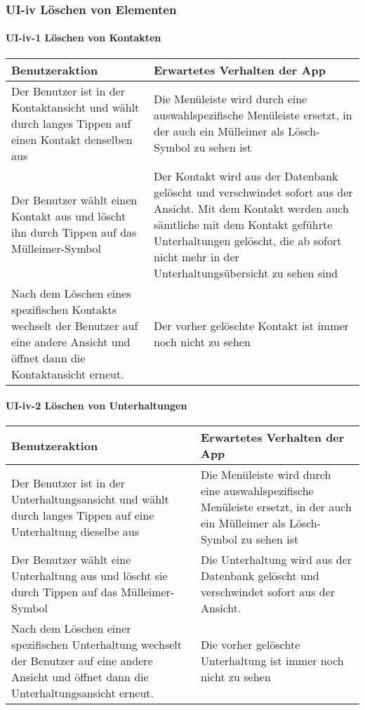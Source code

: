 
\clearpage
\subsubsection{UI-iv Löschen von Elementen}

\paragraph{UI-iv-1 Löschen von Kontakten}

\begin{longtable}{|p{8cm}|p{8.5cm}|}
\hline
Benutzeraktion & Erwartetes Verhalten der App\tabularnewline
\hline

Der Benutzer ist in der Kontaktansicht und wählt durch langes Tippen auf
einen Kontakt denselben aus & Die Menüleiste wird durch eine
auswahlspezifische Menüleiste ersetzt, in der auch ein Mülleimer als
Lösch-Symbol zu sehen ist\tabularnewline
Der Benutzer wählt einen Kontakt aus und löscht ihn durch Tippen auf das
Mülleimer-Symbol & Der Kontakt wird aus der Datenbank gelöscht und
verschwindet sofort aus der Ansicht. Mit dem Kontakt werden auch
sämtliche mit dem Kontakt geführte Unterhaltungen gelöscht, die ab
sofort nicht mehr in der Unterhaltungsübersicht zu sehen
sind\tabularnewline
Nach dem Löschen eines spezifischen Kontakts wechselt der Benutzer auf
eine andere Ansicht und öffnet dann die Kontaktansicht erneut. & Der
vorher gelöschte Kontakt ist immer noch nicht zu sehen\tabularnewline
\hline
\end{longtable}

\paragraph{UI-iv-2 Löschen von Unterhaltungen}

\begin{longtable}{|p{8cm}|p{8.5cm}|}
\hline
Benutzeraktion & Erwartetes Verhalten der App\tabularnewline
\hline

Der Benutzer ist in der Unterhaltungsansicht und wählt durch langes
Tippen auf eine Unterhaltung dieselbe aus & Die Menüleiste wird durch
eine auswahlspezifische Menüleiste ersetzt, in der auch ein Mülleimer
als Lösch-Symbol zu sehen ist\tabularnewline
Der Benutzer wählt eine Unterhaltung aus und löscht sie durch Tippen auf
das Mülleimer-Symbol & Die Unterhaltung wird aus der Datenbank gelöscht
und verschwindet sofort aus der Ansicht.\tabularnewline
Nach dem Löschen einer spezifischen Unterhaltung wechselt der Benutzer
auf eine andere Ansicht und öffnet dann die Unterhaltungsansicht erneut.
& Die vorher gelöschte Unterhaltung ist immer noch nicht zu
sehen\tabularnewline
\hline
\end{longtable}

